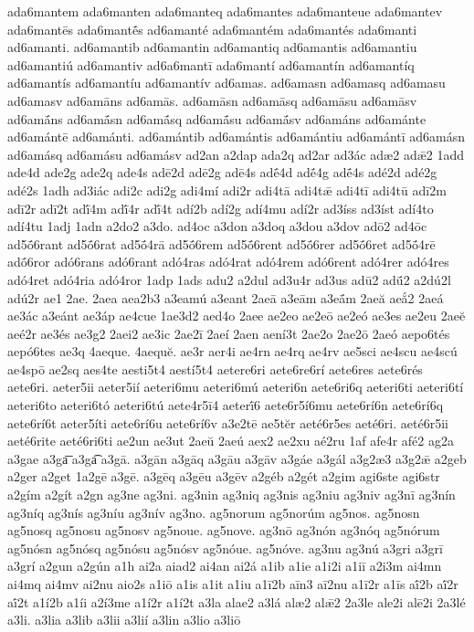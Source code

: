 {ada6mantem
ada6manten
ada6manteq
ada6mantes
ada6manteue
ada6mantev
ada6mantēs
ada6mantḗs
ad6amanté
ada6mantém
ada6mantés
ada6manti
ad6amanti.
ad6amantib
ad6amantin
ad6amantiq
ad6amantis
ad6amantiu
ad6amantiú
ad6amantiv
ad6a6mantī
ada6mantí
ad6amantín
ad6amantíq
ad6amantís
ad6amantíu
ad6amantív
ad6amas.
ad6amasn
ad6amasq
ad6amasu
ad6amasv
ad6amāns
ad6amās.
ad6amāsn
ad6amāsq
ad6amāsu
ad6amāsv
ad6amā́ns
ad6amā́sn
ad6amā́sq
ad6amā́su
ad6amā́sv
ad6amáns
ad6amánte
ad6amántē
ad6amánti.
ad6amántib
ad6amántis
ad6amántiu
ad6amántī
ad6amásn
ad6amásq
ad6amásu
ad6amásv
ad2an
a2dap
ada2q
ad2ar
ad3ác
adæ2
adǣ2
1add
ade4d
ade2g
ade2q
ade4s
adē2d
adē2g
adē4s
adḗ4d
adḗ4g
adḗ4s
adé2d
adé2g
adé2s
1adh
ad3iác
adi2c
adi2g
adi4mí
adi2r
adi4tā
adi4tǣ
adi4tī
adi4tū
adī2m
adī2r
adī2t
adī́4m
adī́4r
adī́4t
adí2b
adí2g
adí4mu
adí2r
ad3íss
ad3íst
adí4to
adí4tu
1adj
1adn
a2do2
a3do.
ad4oc
a3don
a3doq
a3dou
a3dov
adō2
ad4ōc
ad5ṓ6rant
ad5ṓ6rat
ad5ṓ4rā
ad5ṓ6rem
ad5ṓ6rent
ad5ṓ6rer
ad5ṓ6ret
ad5ṓ4rē
adṓ6ror
adó6rans
adó6rant
adó4ras
adó4rat
adó4rem
adó6rent
adó4rer
adó4res
adó4ret
adó4ria
adó4ror
1adp
1ads
adu2
a2dul
ad3u4r
ad3us
adū2
adū́2
a2dú2l
adú2r
ae1
2ae.
2aea
aea2b3
a3eamú
a3eant
2aeā
a3eām
a3eā́m
2aeă
aeắ2
2aeá
ae3ác
a3eánt
ae3áp
ae4cue
1ae3d2
aed4o
2aee
ae2eo
ae2eō
ae2eó
ae3es
ae2eu
2aeĕ
aeé2r
ae3és
ae3g2
2aei2
ae3ic
2ae2ī
2aeí
2aen
aení3t
2ae2o
2ae2ō
2aeó
aepo6tés
aepó6tes
ae3q
4aeque.
4aequĕ.
ae3r
aer4i
ae4rn
ae4rq
ae4rv
ae5sci
ae4scu
ae4scú
ae4spō
ae2sq
aes4te
aesti5t4
aestí5t4
aetere6ri
aete6re6rí
aete6res
aete6rés
aete6ri.
aeter5ii
aeter5ií
aeteri6mu
aeteri6mú
aeteri6n
aete6ri6q
aeteri6ti
aeteri6tí
aeteri6to
aeteri6tó
aeteri6tú
aete4r5ī4
aeterī́6
aete6r5í6mu
aete6rí6n
aete6rí6q
aete6rí6t
aeter5íti
aete6rí6u
aete6rí6v
a3e2tē
ae5tĕr
aeté6r5es
aeté6ri.
aeté6r5ii
aeté6rite
aeté6ri6ti
ae2un
ae3ut
2aeŭ
2aeú
aex2
ae2xu
aé2ru
1af
afe4r
afé2
ag2a
a3gae
a3ga͞
a3ga͡
a3gā.
a3gān
a3gāq
a3gāu
a3gāv
a3gáe
a3gál
a3g2æ3
a3g2ǣ
a2geb
a2ger
a2get
1a2gē
a3gē.
a3gēq
a3gēu
a3gēv
a2géb
a2gét
a2gim
agi6ste
agi6str
a2gím
a2gít
a2gn
ag3ne
ag3ni.
ag3nin
ag3niq
ag3nis
ag3niu
ag3niv
ag3nī
ag3nín
ag3níq
ag3nís
ag3níu
ag3nív
ag3no.
ag5norum
ag5norúm
ag5nos.
ag5nosn
ag5nosq
ag5nosu
ag5nosv
ag5noue.
ag5nove.
ag3nō
ag3nón
ag3nóq
ag5nórum
ag5nósn
ag5nósq
ag5nósu
ag5nósv
ag5nóue.
ag5nóve.
ag3nu
ag3nú
a3gri
a3grī
a3grí
a2gun
a2gún
a1h
ai2a
aiad2
ai4an
ai2á
a1ib
a1ie
a1i2i
a1iī
a2i3m
ai4mn
ai4mq
ai4mv
ai2nu
aio2s
a1iō
a1is
a1it
a1iu
a1ī2b
aīn3
aī2nu
a1ī2r
a1īs
aī́2b
aī́2r
aī́2t
a1í2b
a1íi
a2í3me
a1í2r
a1í2t
a3la
alae2
a3lá
alæ2
alǣ2
2a3le
ale2i
alē2i
2a3lé
a3li.
a3lia
a3lib
a3lii
a3lií
a3lin
a3lio
a3liō
}
